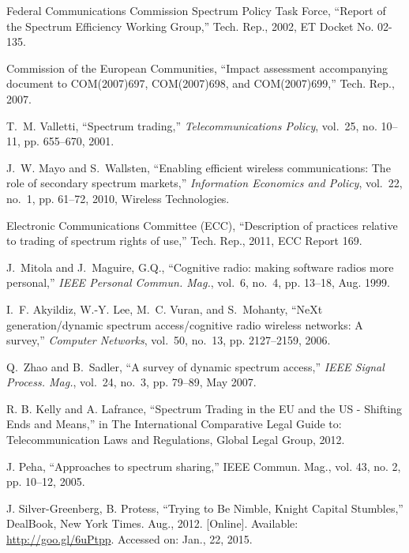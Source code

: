 \begin{thebibliography}{1}
{Federal Communications Commission Spectrum Policy Task Force}, ``Report of the
  {S}pectrum {E}fficiency {W}orking {G}roup,'' Tech. Rep., 2002, {ET} {D}ocket
  {N}o. 02-135.

{Commission of the European Communities}, ``Impact assessment accompanying
  document to {COM}(2007)697, {COM}(2007)698, and {COM}(2007)699,'' Tech. Rep.,
  2007.

T.~M. Valletti, ``Spectrum trading,'' \emph{Telecommunications Policy},
  vol.~25, no. 10–11, pp. 655--670, 2001.

J.~W. Mayo and S.~Wallsten, ``Enabling efficient wireless communications: The
  role of secondary spectrum markets,'' \emph{Information Economics and
  Policy}, vol.~22, no.~1, pp. 61--72, 2010, {W}ireless {T}echnologies.

{Electronic Communications Committee (ECC)}, ``Description of practices
  relative to trading of spectrum rights of use,'' Tech. Rep., 2011, {ECC}
  {R}eport 169.

J.~Mitola and J.~Maguire, G.Q., ``Cognitive radio: making software radios more
  personal,'' \emph{{IEEE} Personal Commun. Mag.}, vol.~6, no.~4, pp. 13--18,
  Aug. 1999.

I.~F. Akyildiz, W.-Y. Lee, M.~C. Vuran, and S.~Mohanty, ``{NeXt}
  generation/dynamic spectrum access/cognitive radio wireless networks: A
  survey,'' \emph{Computer Networks}, vol.~50, no.~13, pp. 2127--2159, 2006.

Q.~Zhao and B.~Sadler, ``A survey of dynamic spectrum access,'' \emph{{IEEE}
  Signal Process. Mag.}, vol.~24, no.~3, pp. 79--89, May 2007.

 R. B. Kelly and A. Lafrance, \enquote{Spectrum Trading in the EU and the US - Shifting Ends and Means,} in The International Comparative Legal Guide to: Telecommunication Laws and Regulations, Global Legal Group, 2012.

 J. Peha, “Approaches to spectrum sharing,” IEEE Commun. Mag., vol. 43, no. 2, pp. 10–12, 2005.

J. Silver-Greenberg, B. Protess, \enquote{Trying to Be Nimble, Knight Capital Stumbles,} DealBook, New York Times. Aug., 2012. [Online]. Available: \url{http://goo.gl/6uPtpp}. Accessed on: Jan., 22, 2015.


\end{thebibliography}
